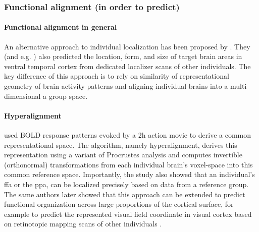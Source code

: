 \subsubsection{Functional alignment (in order to predict)}

\paragraph{Functional alignment in general}
%
An alternative approach to individual localization has been proposed by
\citet{haxby2011common}.
%
They (and e.g. \citet{jiahui2019predicting}) also predicted the location, form,
and size of  target brain areas in ventral temporal cortex from dedicated
localizer scans of other individuals.
%
The key difference of this approach is to rely on similarity of representational
geometry of brain activity patterns and aligning individual brains into a
multi-dimensional a group space.



\paragraph{Hyperalignment}

%
\citet{haxby2011common} used BOLD response patterns evoked by a 2h action movie
to derive a common representational space.
%
The algorithm, namely hyperalignment, derives this representation using a
variant of Procrustes analysis and computes invertible (orthonormal)
transformations from each individual brain’s voxel-space into this common
reference space.
%
Importantly, the study also showed that an individual's \ac{ffa} or the
\ac{ppa}, can be localized precisely based on data from a reference group.
%
The same authors later showed that this approach can be extended to predict
functional organization across large proportions of the cortical surface, for
example to predict the represented visual field coordinate in visual cortex
based on retinotopic mapping scans of other individuals
\citep{guntupalli2016model}.

